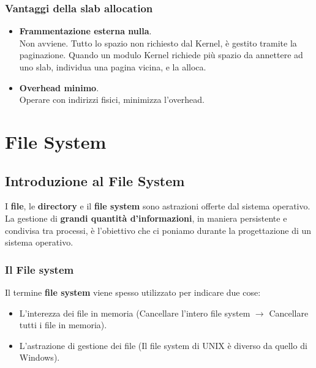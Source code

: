 \documentclass{report}
\begin{document}
\subsection{Vantaggi della slab allocation}
\begin{itemize}
\item \textbf{Frammentazione esterna nulla}.\\
Non avviene. Tutto lo spazio non richiesto dal Kernel, è gestito tramite la paginazione. Quando un modulo Kernel richiede più spazio da annettere ad uno slab, individua una pagina vicina, e la alloca.

\item \textbf{Overhead minimo}.\\
Operare con indirizzi fisici, minimizza l'overhead.
\end{itemize}

\chapter{File System}

\section{Introduzione al File System}
I \textbf{file}, le \textbf{directory} e il \textbf{file system} sono astrazioni offerte dal sistema operativo. La gestione di \textbf{grandi quantità d'informazioni}, in maniera persistente e condivisa tra processi, è l'obiettivo che ci poniamo durante la progettazione di un sistema operativo.

\subsection{Il File system}
Il termine \textbf{file system} viene spesso utilizzato per indicare due cose:
\begin{itemize}
    \item L'interezza dei file in memoria (Cancellare l'intero file system $\to$ Cancellare tutti i file in memoria).
    \item L'astrazione di gestione dei file (Il file system di UNIX è diverso da quello di Windows).
\end{itemize}
\end{document}
